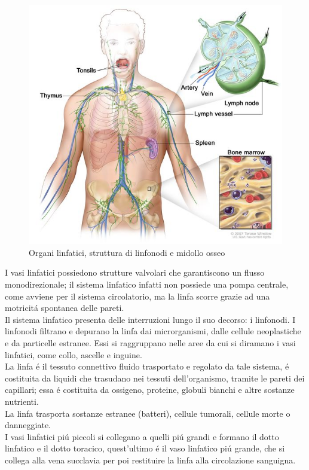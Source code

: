 \begin{figure}[H]
    \begin{center}
    \includegraphics[width=0.5\columnwidth]{img/anatomy.jpeg}
    \end{center}
    \caption{Organi linfatici, struttura di linfonodi e midollo osseo
    \cite{img2}}
    \label{fig:FIGURE_1.2}
\end{figure}

I vasi linfatici possiedono strutture valvolari che garantiscono un flusso monodirezionale; 
il sistema linfatico infatti non possiede una pompa centrale, 
come avviene per il sistema circolatorio, ma la linfa scorre grazie ad una motricit\'a spontanea delle pareti.\\
Il sistema linfatico presenta delle interruzioni lungo il suo decorso: i linfonodi. 
I linfonodi filtrano e depurano la linfa dai microrganismi, dalle cellule neoplastiche e 
da particelle estranee. Essi si raggruppano nelle aree da cui si diramano i vasi linfatici, 
come collo, ascelle e inguine.\\
La linfa \'e il tessuto connettivo fluido trasportato e regolato da tale sistema, \'e costituita 
da liquidi che trasudano nei tessuti dell'organismo, tramite le pareti dei capillari; essa \'e costituita 
da ossigeno, proteine, globuli bianchi e altre sostanze nutrienti.\\ 
La linfa trasporta sostanze estranee (batteri), cellule tumorali, cellule morte o danneggiate.\\ 
I vasi linfatici pi\'u piccoli si collegano a quelli pi\'u grandi e formano il dotto linfatico e il dotto 
toracico, quest'ultimo \'e il vaso linfatico pi\'u grande, che si collega alla vena succlavia per poi restituire 
la linfa alla circolazione sanguigna\cite{BOOK1}. \\

